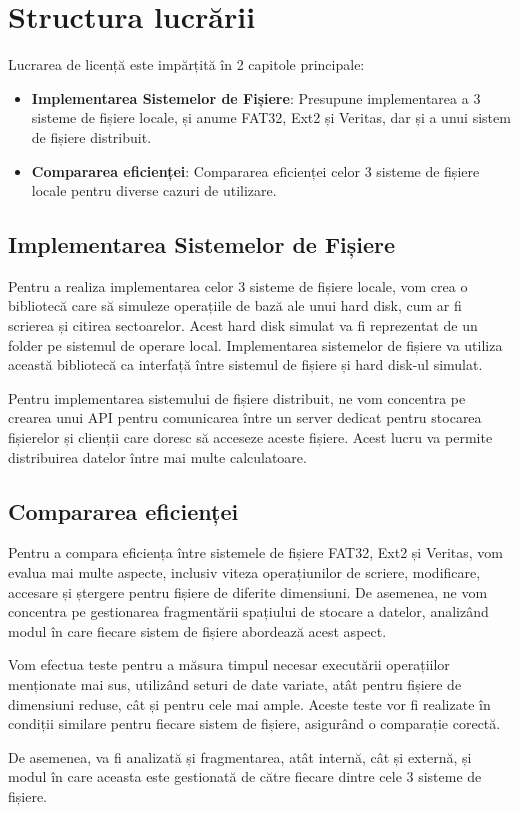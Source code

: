 \section{Structura lucrării}

Lucrarea de licență este impărțită în 2 capitole principale:

\begin{itemize}
  \item \textbf{ Implementarea Sistemelor de Fișiere}: Presupune implementarea a 3 sisteme de
  fișiere locale, și anume FAT32, Ext2 și Veritas, dar și a unui sistem de fișiere distribuit.
  \item \textbf{ Compararea eficienței}: Compararea eficienței celor 3 sisteme de fișiere locale pentru diverse cazuri de utilizare.
\end{itemize}



\subsection{Implementarea Sistemelor de Fișiere}

Pentru a realiza implementarea celor 3 sisteme de fișiere locale, vom crea o bibliotecă care să simuleze operațiile de bază ale unui hard disk, cum ar fi scrierea și citirea sectoarelor. Acest hard disk simulat va fi reprezentat de un folder pe sistemul de operare local. Implementarea sistemelor de fișiere va utiliza această bibliotecă ca interfață între sistemul de fișiere și hard disk-ul simulat.

Pentru implementarea sistemului de fișiere distribuit, ne vom concentra pe crearea unui API pentru comunicarea între un server dedicat pentru stocarea fișierelor și clienții care doresc să acceseze aceste fișiere. Acest lucru va permite distribuirea datelor între mai multe calculatoare.

\subsection{Compararea eficienței}

Pentru a compara eficiența între sistemele de fișiere FAT32, Ext2 și Veritas, vom evalua mai multe aspecte, inclusiv viteza operațiunilor de scriere, modificare, accesare și ștergere pentru fișiere de diferite dimensiuni. De asemenea, ne vom concentra pe gestionarea fragmentării spațiului de stocare a datelor, analizând modul în care fiecare sistem de fișiere abordează acest aspect.

Vom efectua teste pentru a măsura timpul necesar executării operațiilor menționate mai sus, utilizând seturi de date variate, atât pentru fișiere de dimensiuni reduse, cât și pentru cele mai ample. Aceste teste vor fi realizate în condiții similare pentru fiecare sistem de fișiere, asigurând o comparație corectă.

De asemenea, va fi analizată și fragmentarea, atât internă, cât și externă, și modul în care aceasta este gestionată de către fiecare dintre cele 3 sisteme de fișiere.
